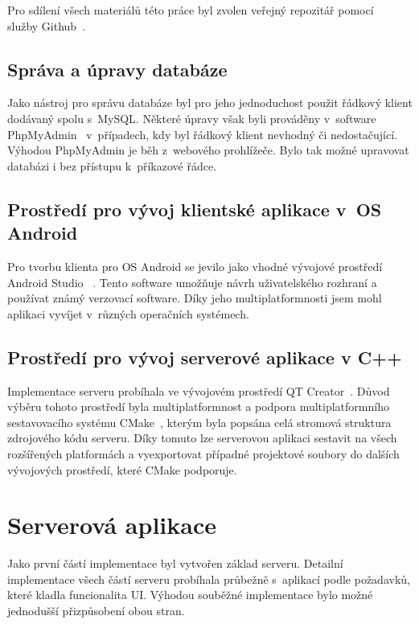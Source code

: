 \documentclass[thesis=B,czech]{FITthesis}[2013/10/20]
\begin{document}
Pro sdílení všech materiálů této práce byl zvolen veřejný repozitář pomocí~\cite{repo} služby Github~\cite{github}.

\subsection{Správa a úpravy databáze}

Jako nástroj pro správu databáze byl pro jeho jednoduchost použit řádkový klient dodávaný spolu s~MySQL. Některé úpravy však byli prováděny v~software PhpMyAdmin~\cite{phpmyadmin} v~případech, kdy byl řádkový klient nevhodný či nedostačující. Výhodou PhpMyAdmin je běh z~webového prohlížeče. Bylo tak možné upravovat databázi i bez přístupu k~příkazové řádce.

\subsection{Prostředí pro vývoj klientské aplikace v~OS Android}

Pro tvorbu klienta pro OS Android se jevilo jako vhodné vývojové prostředí Android Studio ~\cite{android_studio}. Tento software umožňuje návrh uživatelského rozhraní a používat známý verzovací software. Díky jeho multiplatformnosti jsem mohl aplikaci vyvíjet v~různých operačních systémech.

\subsection{Prostředí pro vývoj serverové aplikace v C++}

Implementace serveru probíhala ve vývojovém prostředí QT Creator~\cite{qtcreator}. Důvod výběru tohoto prostředí byla multiplatformnost a podpora multiplatformního sestavovacího systému CMake~\cite{cmake}, kterým byla popsána celá stromová struktura zdrojového kódu serveru. Díky tomuto lze serverovou aplikaci sestavit na všech rozšířených platformách a vyexportovat případné projektové soubory do dalších vývojových prostředí, které CMake podporuje.

\section{Serverová aplikace}

Jako první částí implementace byl vytvořen základ serveru. Detailní implementace všech částí serveru probíhala průbežně s~aplikací podle požadavků, které kladla funcionalita UI. Výhodou souběžné implementace bylo možné jednodušší přizpůsobení obou stran.
\end{document}
